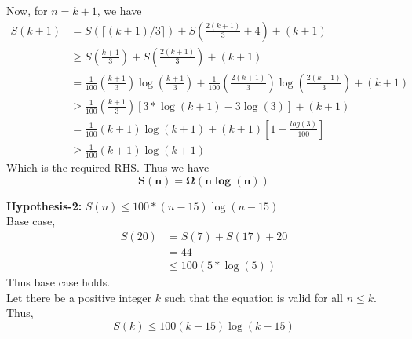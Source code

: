 \documentclass[11pt]{article}
\begin{document}
\begin{enumerate}
    \noindent Now, for $n=k+1$, we have
    \begin{equation}
        \begin{split}
           S(k+1) &= S(\lceil (k+1)/3 \rceil) + S\left(\frac{2(k+1)}{3} +4\right)+(k+1)\\
           &\geq S\left(\frac{k+1}{3}\right) + S\left(\frac{2(k+1)}{3}\right)+(k+1)\\
           &= \frac{1}{100}\left(\frac{k+1}{3}\right)\log\left(\frac{k+1}{3}\right) + \frac{1}{100}\left(\frac{2(k+1)}{3}\right)\log\left(\frac{2(k+1)}{3}\right)+(k+1)\\
           &\geq \frac{1}{100}\left(\frac{k+1}{3}\right)\left[3*\log(k+1)-3\log(3)\right] +(k+1)\\
           &= \frac{1}{100}(k+1)\log(k+1) +(k+1)\left[1-\frac{log(3)}{100}\right]\\
           &\geq \frac{1}{100}(k+1)\log(k+1)
        \end{split}
    \end{equation}
    Which is the required RHS. Thus we have
    $$\mathbf{S(n) = \Omega(n\log(n))}$$
    

\noindent \textbf{Hypothesis-2:} $S(n) \leq 100*(n-15)\log(n-15)$\\
\noindent Base case, 
    \begin{equation}
        \begin{split}
           S(20) &= S(7)+S(17)+20\\
           &= 44\\
           &\leq 100(5*\log(5))
        \end{split}
    \end{equation}
    Thus base case holds.\\
    \noindent Let there be a positive integer $k$ such that the equation is valid for all $n \leq k$. Thus,
    $$ S(k) \leq 100(k-15)\log(k-15)$$
    

\end{enumerate}
\end{document}
